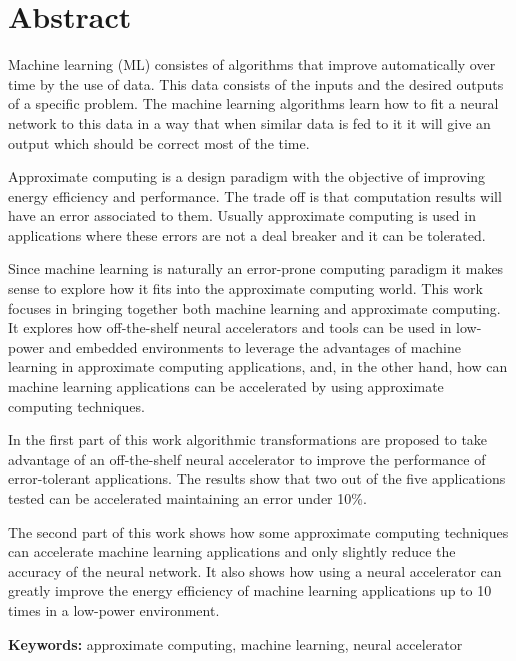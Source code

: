 \chapter*{Abstract}
\thispagestyle{empty}

Machine learning (ML) consistes of algorithms that improve automatically over time by the use of data. This data consists of the inputs and the desired outputs of a specific problem. The machine learning algorithms learn how to fit a neural network to this data in a way that when similar data is fed to it it will give an output which should be correct most of the time.

Approximate computing is a design paradigm with the objective of improving energy efficiency and performance. The trade off is that computation results will have an error associated to them. Usually approximate computing is used in applications where these errors are not a deal breaker and it can be tolerated.

Since machine learning is naturally an error-prone computing paradigm it makes sense to explore how it fits into the approximate computing world. This work focuses in bringing together both machine learning and approximate computing. It explores how off-the-shelf neural accelerators and tools can be used in low-power and embedded environments to leverage the advantages of machine learning in approximate computing applications, and, in the other hand, how can machine learning applications can be accelerated by using approximate computing techniques.

In the first part of this work algorithmic transformations are proposed to take advantage of an off-the-shelf neural accelerator to improve the performance of error-tolerant applications. The results show that two out of the five applications tested can be accelerated maintaining an error under 10\%.

The second part of this work shows how some approximate computing techniques can accelerate machine learning applications and only slightly reduce the accuracy of the neural network. It also shows how using a neural accelerator can greatly improve the energy efficiency of machine learning applications up to 10 times in a low-power environment.

\bigskip


\textbf{Keywords:} approximate computing, machine learning, neural accelerator

\cleardoublepage

